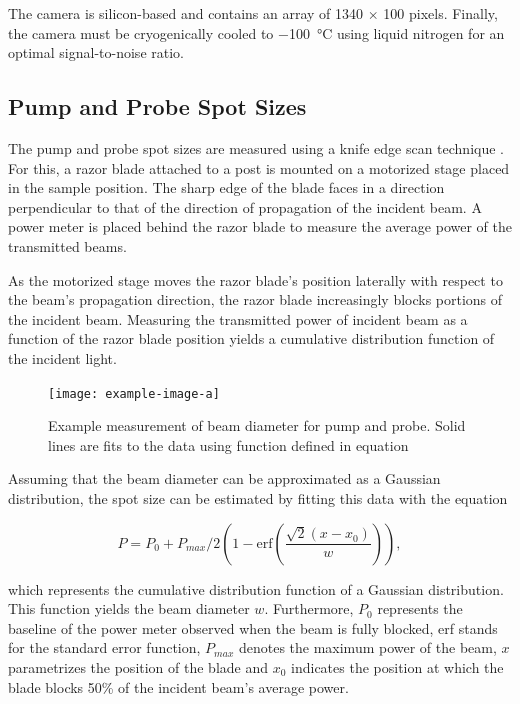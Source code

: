 The camera is silicon-based and contains an array of 1340 $\times$ 100 pixels. Finally, the camera must be cryogenically cooled to \SI{-100}{\celsius} using liquid nitrogen for an optimal signal-to-noise ratio.


\subsection{Pump and Probe Spot Sizes}
The pump and probe spot sizes are measured using a knife edge scan technique \cite{firester1977knife}. For this, a razor blade attached to a post is mounted on a motorized stage placed in the sample position. The sharp edge of the blade faces in a direction perpendicular to that of the direction of propagation of the incident beam. A power meter is placed behind the razor blade to measure the average power of the transmitted beams.

As the motorized stage moves the razor blade's position laterally with respect to the beam's propagation direction, the razor blade increasingly blocks portions of the incident beam.  Measuring the transmitted power of incident beam as a function of the razor blade position yields a cumulative distribution function of the incident light.

\begin{figure}[h]
	\centering
	\texttt{[image: example-image-a]}
	\caption{Example measurement of beam diameter for pump and probe. Solid lines are fits to the data using function defined in equation}
	\label{fig:beam_diamter_measurement}
\end{figure}

Assuming that the beam diameter can be approximated as a Gaussian distribution, the spot size can be estimated by fitting this data with the equation 

\begin{equation}
	P = P_0 + P_{max}/2 \left( 1 - \mathrm{erf} \left( \dfrac{\sqrt{2}(x - x_0)}{w} \right) \right),
\end{equation}

which represents the cumulative distribution function of a Gaussian distribution. This function yields the beam diameter $w$. Furthermore, $P_0$ represents the baseline of the power meter observed when the beam is fully blocked, erf stands for the standard error function, $P_{max}$ denotes the maximum power of the beam, $x$ parametrizes the position of the blade and $x_0$ indicates the position at which the blade blocks 50\% of the incident beam's average power.  







